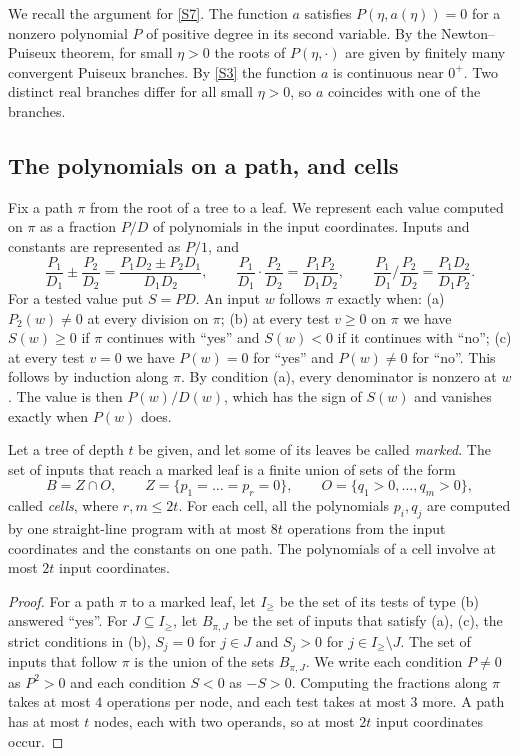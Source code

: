 We recall the argument for \ref{S7}. The function $a$ satisfies $P(\eta,a(\eta))=0$ for a nonzero polynomial $P$ of positive degree in its second variable. By the Newton--Puiseux theorem, for small $\eta>0$ the roots of $P(\eta,\cdot)$ are given by finitely many convergent Puiseux branches. By \ref{S3} the function $a$ is continuous near $0^+$. Two distinct real branches differ for all small $\eta>0$, so $a$ coincides with one of the branches.

\subsection{The polynomials on a path, and cells}\label{sec:cells}

Fix a path $\pi$ from the root of a tree to a leaf. We represent each value computed on $\pi$ as a fraction $P/D$ of polynomials in the input coordinates. Inputs and constants are represented as $P/1$, and
\[
\frac{P_1}{D_1}\pm\frac{P_2}{D_2}=\frac{P_1D_2\pm P_2D_1}{D_1D_2},\qquad
\frac{P_1}{D_1}\cdot\frac{P_2}{D_2}=\frac{P_1P_2}{D_1D_2},\qquad
\frac{P_1}{D_1}\Big/\frac{P_2}{D_2}=\frac{P_1D_2}{D_1P_2}.
\]
For a tested value put $S=PD$. An input $w$ follows $\pi$ exactly when: \textup{(a)} $P_2(w)\ne0$ at every division on $\pi$; \textup{(b)} at every test $v\ge0$ on $\pi$ we have $S(w)\ge0$ if $\pi$ continues with ``yes'' and $S(w)<0$ if it continues with ``no''; \textup{(c)} at every test $v=0$ we have $P(w)=0$ for ``yes'' and $P(w)\ne0$ for ``no''. This follows by induction along $\pi$. By condition \textup{(a)}, every denominator is nonzero at $w$. The value is then $P(w)/D(w)$, which has the sign of $S(w)$ and vanishes exactly when $P(w)$ does.

\begin{lemma}[cells]\label{lem:cells}
Let a tree of depth $t$ be given, and let some of its leaves be called \emph{marked}. The set of inputs that reach a marked leaf is a finite union of sets of the form
\[
B=Z\cap O,\qquad Z=\{p_1=\dots=p_r=0\},\qquad O=\{q_1>0,\dots,q_m>0\},
\]
called \emph{cells}, where $r,m\le2t$. For each cell, all the polynomials $p_i,q_j$ are computed by one straight-line program with at most $8t$ operations from the input coordinates and the constants on one path. The polynomials of a cell involve at most $2t$ input coordinates.
\end{lemma}

\begin{proof}
For a path $\pi$ to a marked leaf, let $I_\ge$ be the set of its tests of type \textup{(b)} answered ``yes''. For $J\subseteq I_\ge$, let $B_{\pi,J}$ be the set of inputs that satisfy \textup{(a)}, \textup{(c)}, the strict conditions in \textup{(b)}, $S_j=0$ for $j\in J$ and $S_j>0$ for $j\in I_\ge\setminus J$. The set of inputs that follow $\pi$ is the union of the sets $B_{\pi,J}$. We write each condition $P\ne0$ as $P^2>0$ and each condition $S<0$ as $-S>0$. Computing the fractions along $\pi$ takes at most $4$ operations per node, and each test takes at most $3$ more. A path has at most $t$ nodes, each with two operands, so at most $2t$ input coordinates occur.
\end{proof}
